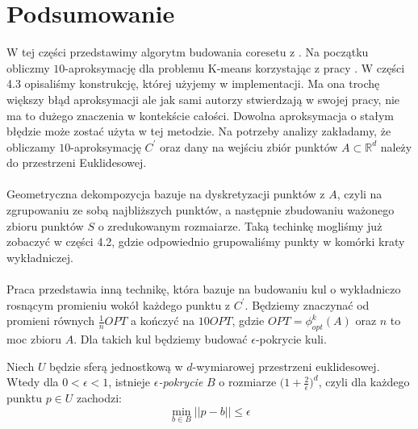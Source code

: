 \section{Podsumowanie}

W tej części przedstawimy algorytm budowania coresetu z \cite{DBLP:journals/ki/MunteanuS18}.
Na początku obliczmy $10$-aproksymację dla problemu K-means korzystając z pracy \cite{Arya2004LocalSH}.
W części 4.3 opisaliśmy konstrukcję, której użyjemy w implementacji.
Ma ona trochę większy błąd aproksymacji ale jak sami autorzy \cite{DBLP:journals/ki/MunteanuS18} stwierdzają w swojej pracy, nie ma to dużego znaczenia w kontekście całości.
Dowolna aproksymacja o stałym błędzie może zostać użyta w tej metodzie.
Na potrzeby analizy zakładamy, że obliczamy $10$-aproksymację $C^{'}$ oraz dany na wejściu zbiór punktów $A \subset \mathbb{R}^d$ należy do przestrzeni Euklidesowej.
\\~\\
Geometryczna dekompozycja bazuje na dyskretyzacji punktów z $A$, czyli na zgrupowaniu ze sobą najbliższych punktów, a następnie zbudowaniu ważonego zbioru punktów $S$ o zredukowanym rozmaiarze.
Taką techinkę mogliśmy już zobaczyć w części 4.2, gdzie odpowiednio grupowaliśmy punkty w komórki kraty wykładniczej.
\\~\\
Praca \cite{DBLP:journals/ki/MunteanuS18} przedstawia inną technikę, która bazuje na budowaniu kul o wykładniczo rosnącym promieniu wokół każdego punktu z $C^{'}$.
Będziemy znaczynać od promieni równych $\frac{1}{n}OPT$ a kończyć na $10 OPT$, gdzie $OPT = \phi_{opt}^{k}(A)$ oraz $n$ to moc zbioru $A$.
Dla takich kul będziemy budować $\epsilon$-pokrycie kuli.

\begin{lemma}{\cite{pisier_1989}}
    Niech $U$ będzie sferą jednostkową w $d$-wymiarowej przestrzeni euklidesowej.
    Wtedy dla $0 < \epsilon < 1$, istnieje \textit{$\epsilon$-pokrycie} $B$ o rozmiarze $\Big(1 +\frac{2}{\epsilon}\Big)^{d}$, czyli dla każdego punktu $p \in U$ zachodzi:
    \begin{equation}
        \min_{b \in B} ||p-b|| \leq \epsilon
    \end{equation}
\end{lemma}

